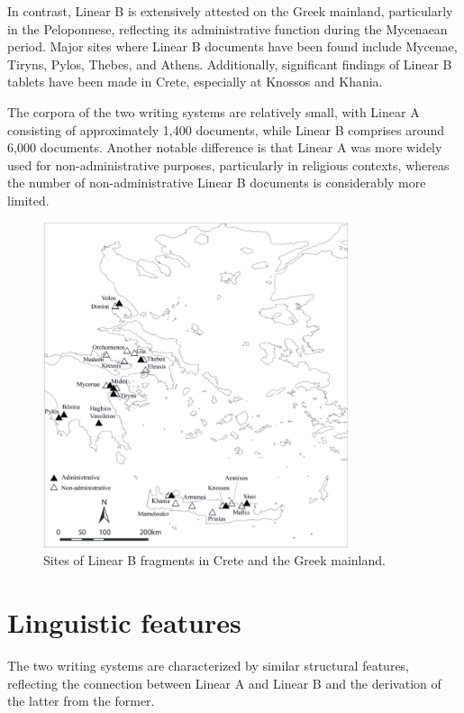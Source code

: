 In contrast, Linear B is extensively attested on the Greek mainland, particularly in the Peloponnese, reflecting its administrative function during the Mycenaean period.
Major sites where Linear B documents have been found include Mycenae, Tiryns, Pylos, Thebes, and Athens.
Additionally, significant findings of Linear B tablets have been made in Crete, especially at Knossos and Khania.

The corpora of the two writing systems are relatively small, with Linear A consisting of approximately 1,400 documents, while Linear B comprises around 6,000 documents.
Another notable difference is that Linear A was more widely used for non-administrative purposes, particularly in religious contexts, whereas the number of non-administrative Linear B documents is considerably more limited. \cite{salg-ch1}


\begin{figure}[H]
    \centering
    \includegraphics[width=0.8\textwidth]{Images/mainland_LB.jpg} %
    \caption{Sites of Linear B fragments in Crete and the Greek mainland.\protect\footnotemark}
    \label{fig:mainland_LB}
\end{figure}


\section{Linguistic features}
The two writing systems are characterized by similar structural features, reflecting the connection between Linear A and Linear B and the derivation of the latter from the former.

